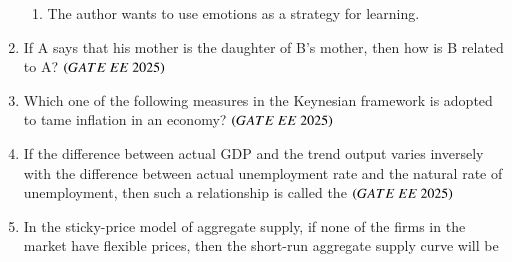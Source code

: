 \documentclass[journal,12pt,onecolumn]{IEEEtran}
\theoremstyle{remark}
\begin{document}
\begin{enumerate}
\begin{enumerate}
  \item The author wants to use emotions as a strategy for learning.   
   \end{enumerate}
   \item If A says that his mother is the daughter of B's mother, then how is B related to A?      
    \hfill $\brak{GATE\ EE\ 2025}$
    \begin{enumerate}
       \end{enumerate}
    \item Which one of the following measures in the Keynesian framework is adopted to tame inflation in an economy?  
    \hfill $\brak{GATE\ EE\ 2025}$
    \begin{enumerate}
      \end{enumerate}
    \item If the difference between actual GDP and the trend output varies inversely with the difference between actual unemployment rate and the natural rate of unemployment, then such a relationship is called the       \hfill $\brak{GATE\ EE\ 2025}$
    \begin{enumerate}
      \end{enumerate}
    \item In the sticky-price model of aggregate supply, if none of the firms in the market have flexible prices, then the short-run aggregate supply curve will be

\end{enumerate}
\end{document}
